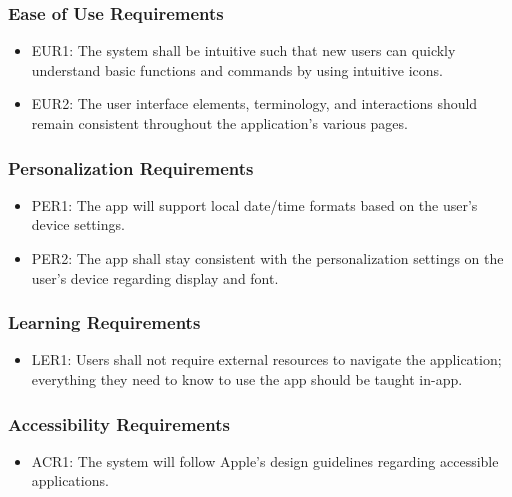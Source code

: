 \documentclass[12pt]{article}
\begin{document}
\subsubsection{Ease of Use Requirements}
\begin{itemize}
\item EUR1: The system shall be intuitive such that new users can quickly understand basic functions and commands by using intuitive icons.
\item EUR2: The user interface elements, terminology, and interactions should remain consistent throughout the application’s various pages.
\end{itemize}

\subsubsection{Personalization Requirements}
\begin{itemize}
\item PER1: The app will support local date/time formats based on the user’s device settings.
\item PER2: The app shall stay consistent with the personalization settings on the user’s device regarding display and font.
\end{itemize}

\subsubsection{Learning Requirements}
\begin{itemize}
\item LER1: Users shall not require external resources to navigate the application; everything they need to know to use the app should be taught in-app.
\end{itemize}

\subsubsection{Accessibility Requirements}
\begin{itemize}
\item ACR1: The system will follow Apple’s design guidelines regarding accessible applications.
\end{itemize}
\end{document}
